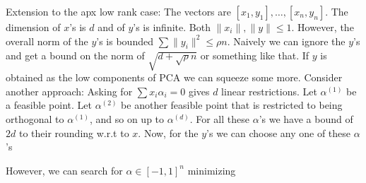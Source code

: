 \documentclass{article} %
\begin{document}
Extension to the apx low rank case: The vectors are $[x_1,y_1],\ldots,[x_n,y_n]$. The dimension of $x$'s is $d$ and of $y$'s is infinite. Both $\|x_i\|, \|y\| \leq 1$. However, the overall norm of the $y$'s is bounded $\sum \|y_i\|^2 \leq \rho n$. Naively we can ignore the $y$'s and get a bound on the norm of $\sqrt{d + \sqrt{\rho} n}$ or something like that. If $y$ is obtained as the low components of PCA we can squeeze some more.
Consider another approach: Asking for $\sum x_i \alpha_i =0 $ gives $d$ linear restrictions. Let $\alpha^{(1)}$ be a feasible point. Let $\alpha^{(2)}$ be another feasible point that is restricted to being orthogonal to $\alpha^{(1)}$, and so on up to $\alpha^{(d)}$. For all these $\alpha$'s we have a bound of $2d$ to their rounding w.r.t to $x$. Now, for the $y$'s we can choose any one of these $\alpha$'s

However, we can search for $\alpha \in [-1,1]^n$ minimizing
\end{document}
